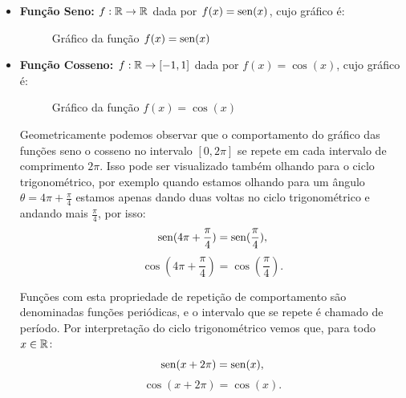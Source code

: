   \begin{itemize}
  \item \textbf{Função Seno:} $f: \mathbb{R} \rightarrow \mathbb{R}$ dada por $f(x)= \operatorname{sen} (x)$, cujo gráfico é:

  \begin{figure}[H]
  \centering
    \caption{Gráfico da função $f(x)= \operatorname{sen}(x)$}
  \end{figure}


  \item \textbf{Função Cosseno:} $f: \mathbb{R} \rightarrow [-1, 1]$ dada por $f(x)= \cos(x)$, cujo gráfico é:

  \begin{figure}[H]
  \centering
    \caption{Gráfico da função $f(x)= \cos(x)$}
  \end{figure}

  Geometricamente podemos observar que o comportamento do gráfico das funções seno o cosseno no intervalo $[0, 2\pi]$ se repete em cada intervalo de comprimento $2\pi$. Isso pode ser visualizado também olhando para o ciclo trigonométrico, por exemplo quando estamos olhando para um ângulo $\theta= 4\pi + \frac{\pi}{4}$ estamos apenas dando duas voltas no ciclo trigonométrico e andando mais $\frac{\pi}{4}$, por isso:
\begin{equation*}
\operatorname{sen}(4\pi + \frac{\pi}{4})= \operatorname{sen}(\frac{\pi}{4}) ,
\end{equation*}
\begin{equation*}
\cos(4\pi + \frac{\pi}{4})= \cos(\frac{\pi}{4}). 
\end{equation*}
  
  Funções com esta propriedade de repetição de comportamento são denominadas funções periódicas, e o intervalo que se repete é chamado de período.  Por interpretação do ciclo trigonométrico vemos que, para todo $x \in \mathbb{R}$:
\begin{equation*}
\operatorname{sen}(x + 2 \pi)= \operatorname{sen}(x) ,
\end{equation*}
\begin{equation*}
\cos(x + 2\pi)= \cos(x). 
\end{equation*}
  

\end{itemize}
